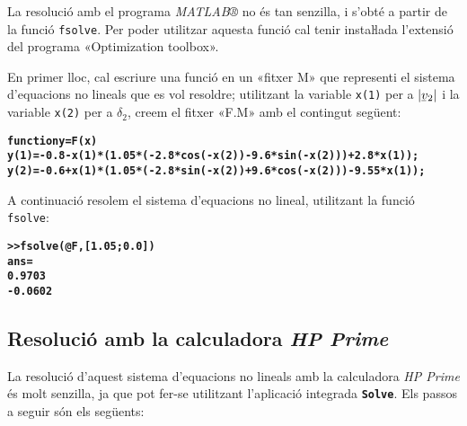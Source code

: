 La resolució amb el programa \emph{MATLAB®} no és tan senzilla, i s'obté a partir de la funció  \texttt{fsolve}. Per poder utilitzar aquesta funció cal tenir instaŀlada l'extensió del programa «Optimization toolbox».

En primer lloc, cal escriure una funció en un «fitxer M» que representi el sistema d'equacions no lineals que es vol resoldre; utilitzant la variable \texttt{x(1)} per a $|\cmplx{v}_2|$ i la variable \texttt{x(2)} per a $\delta_2$, creem el fitxer «F.M» amb el contingut següent:

\begin{alltt}
\bfseries\small{}function y= F(x)
y(1) = -0.8 - x(1)*(1.05*(-2.8*cos(-x(2)) - 9.6*sin(-x(2))) + 2.8*x(1));
y(2) = -0.6 + x(1)*(1.05*(-2.8*sin(-x(2)) + 9.6*cos(-x(2))) - 9.55*x(1));
\end{alltt}

A continuació resolem el sistema d'equacions no lineal, utilitzant la funció \texttt{fsolve}:

\begin{alltt}
\bfseries\small>> fsolve(@F, [1.05; 0.0])\\
ans =\\
    0.9703
   -0.0602
\end{alltt}

\subsection{Resolució amb la calculadora \emph{HP Prime}}

La resolució d'aquest sistema d'equacions no lineals amb la calculadora \emph{HP Prime} és molt senzilla, ja que pot fer-se utilitzant l'aplicació integrada \texttt{\textbf{Solve}}. Els passos a seguir són els següents:

